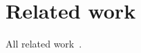 \section{Related work}
\label{sec:RelatedWork}
All related work~\cite{Gordon:Kim:Perkins:Gilham:Nguyen:Rinard:NDSS:2015}.